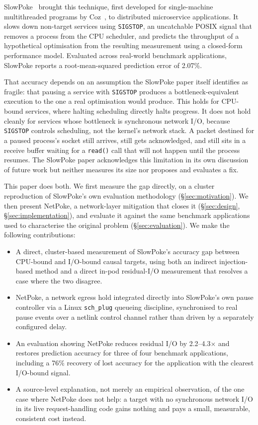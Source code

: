 SlowPoke~\cite{slowpoke2026} brought this technique, first developed for
single-machine multithreaded programs by Coz~\cite{coz2015}, to distributed
microservice applications. It slows down non-target services using
\texttt{SIGSTOP}, an uncatchable POSIX signal that removes a process from
the CPU scheduler, and predicts the throughput of a hypothetical
optimisation from the resulting measurement using a closed-form performance
model. Evaluated across real-world benchmark applications, SlowPoke reports
a root-mean-squared prediction error of 2.07\%.

That accuracy depends on an assumption the SlowPoke paper itself identifies
as fragile: that pausing a service with \texttt{SIGSTOP} produces a
bottleneck-equivalent execution to the one a real optimisation would
produce. This holds for CPU-bound services, where halting scheduling
directly halts progress. It does not hold cleanly for services whose
bottleneck is synchronous network I/O, because \texttt{SIGSTOP} controls
scheduling, not the kernel's network stack. A packet destined for a paused
process's socket still arrives, still gets acknowledged, and still sits in
a receive buffer waiting for a \texttt{read()} call that will not happen
until the process resumes. The SlowPoke paper acknowledges this limitation
in its own discussion of future work but neither measures its size nor
proposes and evaluates a fix.

This paper does both. We first measure the gap directly, on a cluster
reproduction of SlowPoke's own evaluation methodology (\S\ref{sec:motivation}).
We then present NetPoke, a network-layer mitigation that closes it
(\S\ref{sec:design}, \S\ref{sec:implementation}), and evaluate it against
the same benchmark applications used to characterise the original problem
(\S\ref{sec:evaluation}). We make the following contributions:

\begin{itemize}
\item A direct, cluster-based measurement of SlowPoke's accuracy gap
  between CPU-bound and I/O-bound causal targets, using both an indirect
  injection-based method and a direct in-pod residual-I/O measurement that
  resolves a case where the two disagree.
\item NetPoke, a network egress hold integrated directly into SlowPoke's
  own pause controller via a Linux \texttt{sch\_plug} queueing discipline,
  synchronised to real pause events over a netlink control channel rather
  than driven by a separately configured delay.
\item An evaluation showing NetPoke reduces residual I/O by 2.2--4.3$\times$
  and restores prediction accuracy for three of four benchmark applications,
  including a 76\% recovery of lost accuracy for the application with the
  clearest I/O-bound signal.
\item A source-level explanation, not merely an empirical observation, of
  the one case where NetPoke does not help: a target with no synchronous
  network I/O in its live request-handling code gains nothing and pays a
  small, measurable, consistent cost instead.
\end{itemize}

